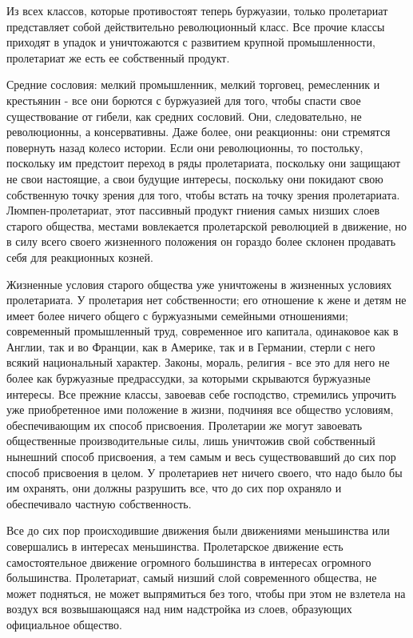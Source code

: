 \documentclass[12pt]{article}
\newcommand{\parnum}{(\arabic{parcount})}
\newcounter{parcount}
\newenvironment{parnumbers}{%
  \par%
  \everypar{\noindent \stepcounter{parcount}\marginpar[]{\parnum}}%
}{}
\begin{document}
\begin{parnumbers}
    Из всех классов, которые противостоят теперь буржуазии, только пролетариат представляет собой действительно революционный класс. Все прочие классы приходят в упадок и уничтожаются с развитием крупной промышленности, пролетариат же есть ее собственный продукт.

    Средние сословия: мелкий промышленник, мелкий торговец, ремесленник и крестьянин - все они борются с буржуазией для того, чтобы спасти свое существование от гибели, как средних сословий. Они, следовательно, не революционны, а консервативны. Даже более, они реакционны: они стремятся повернуть назад колесо истории. Если они революционны, то постольку, поскольку им предстоит переход в ряды пролетариата, поскольку они защищают не свои настоящие, а свои будущие интересы, поскольку они покидают свою собственную точку зрения для того, чтобы встать на точку зрения пролетариата. Люмпен-пролетариат, этот пассивный продукт гниения самых низших слоев старого общества, местами вовлекается пролетарской революцией в движение, но в силу всего своего жизненного положения он гораздо более склонен продавать себя для реакционных козней.

    Жизненные условия старого общества уже уничтожены в жизненных условиях пролетариата. У пролетария нет собственности; его отношение к жене и детям не имеет более ничего общего с буржуазными семейными отношениями; современный промышленный труд, современное иго капитала, одинаковое как в Англии, так и во Франции, как в Америке, так и в Германии, стерли с него всякий национальный характер. Законы, мораль, религия - все это для него не более как буржуазные предрассудки, за которыми скрываются буржуазные интересы. Все прежние классы, завоевав себе господство, стремились упрочить уже приобретенное ими положение в жизни, подчиняя все общество условиям, обеспечивающим их способ присвоения. Пролетарии же могут завоевать общественные производительные силы, лишь уничтожив свой собственный нынешний способ присвоения, а тем самым и весь существовавший до сих пор способ присвоения в целом. У пролетариев нет ничего своего, что надо было бы им охранять, они должны разрушить все, что до сих пор охраняло и обеспечивало частную собственность.

    Все до сих пор происходившие движения были движениями меньшинства или совершались в интересах меньшинства. Пролетарское движение есть самостоятельное движение огромного большинства в интересах огромного большинства. Пролетариат, самый низший слой современного общества, не может подняться, не может выпрямиться без того, чтобы при этом не взлетела на воздух вся возвышающаяся над ним надстройка из слоев, образующих официальное общество.


\end{parnumbers}
\end{document}
